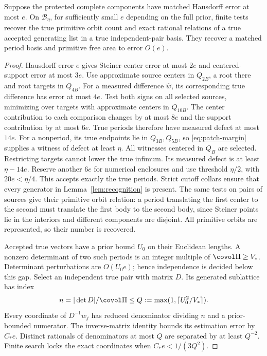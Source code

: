 \begin{lemma}\label{lem:locking}
Suppose the protected complete components have matched Hausdorff
error at most $e$. On $\mathcal B_\eta$, for sufficiently small $e$
depending on the full prior, finite tests recover the true primitive
orbit count and exact rational relations of a true accepted generating
list in a true independent-pair basis. They recover a matched period
basis and primitive free area to error $O(e)$.
\end{lemma}
\begin{proof}
Hausdorff error $e$ gives Steiner-center error at most $2e$ and
centered-support error at most $3e$. Use approximate source centers
in $Q_{2B}$, a root there and root targets in $Q_{4B}$. For a measured
difference $\widehat w$, its corresponding true difference has error
at most $4e$. Test both signs on all selected sources, minimizing over
targets with approximate centers in $Q_{10B}$. The center contribution
to each comparison changes by at most $8e$ and the support contribution
by at most $6e$. True periods therefore have measured defect at most
$14e$. For a nonperiod, its true endpoints lie in $Q_{3B},Q_{5B}$,
so \eqref{eq:patch-margin} supplies a witness of defect at least $\eta$.
All witnesses centered in $Q_B$ are selected. Restricting targets cannot
lower the true infimum. Its measured defect is at least $\eta-14e$.
Reserve another $6e$ for numerical enclosures and use threshold $\eta/2$,
with $20e<\eta/4$. This accepts exactly the true periods. Strict cutoff
collars ensure that every generator in Lemma~\ref{lem:recognition}
is present. The same tests on pairs of sources give their primitive
orbit relation: a period translating the first center to the second
must translate the first body to the second body, since Steiner points
lie in the interiors and different components are disjoint. All
primitive orbits are represented, so their number is recovered.

Accepted true vectors have a prior bound $U_0$ on their Euclidean
lengths. A nonzero determinant of two such periods is an integer
multiple of $\covol\Pi\ge V_*$. Determinant perturbations are
$O(U_0e)$; hence independence is decided below this gap. Select an
independent true pair with matrix $D$. Its generated sublattice has
index
\[
       n=|\det D|/\covol\Pi\le Q:=\max(1,\lceil U_0^2/V_*\rceil).
\]
Every coordinate of $D^{-1}w_j$ has reduced denominator dividing $n$
and a prior-bounded numerator. The inverse-matrix identity bounds its
estimation error by $C_*e$. Distinct rationals of denominators at most
$Q$ are separated by at least $Q^{-2}$. Finite search locks the exact
coordinates when $C_*e<1/(3Q^2)$.


\end{proof}
